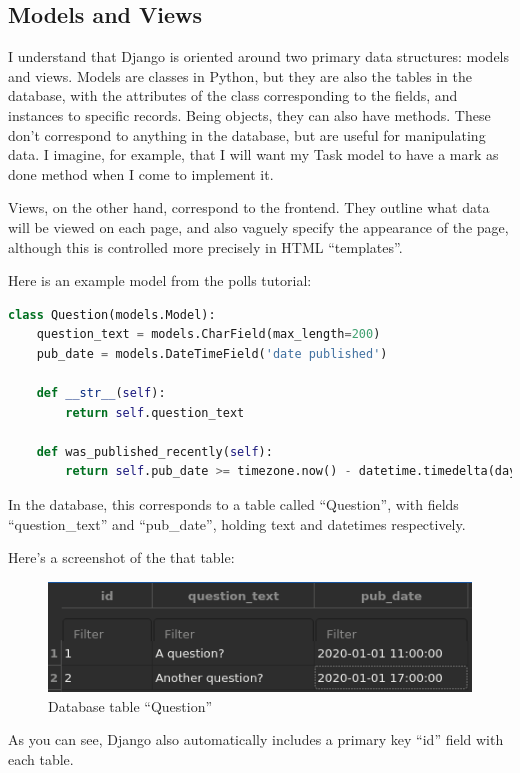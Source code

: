 \documentclass{article}
\begin{document}
\subsection{Models and Views}
I understand that Django is oriented around two primary data structures:
models and views.
Models are classes in Python,
but they are also the tables in the database,
with the attributes of the class corresponding to the fields,
and instances to specific records.
Being objects, they can also have methods.
These don't correspond to anything in the database,
but are useful for manipulating data.
I imagine, for example, that I will want my Task model to have a mark as done method when I come to implement it.

Views, on the other hand, correspond to the frontend.
They outline what data will be viewed on each page,
and also vaguely specify the appearance of the page,
although this is controlled more precisely in HTML ``templates''.

Here is an example model from the polls tutorial:
\begin{lstlisting}[language=Python]
class Question(models.Model):
    question_text = models.CharField(max_length=200)
    pub_date = models.DateTimeField('date published')

    def __str__(self):
        return self.question_text

    def was_published_recently(self):
        return self.pub_date >= timezone.now() - datetime.timedelta(days=1)
\end{lstlisting}

In the database,
this corresponds to a table called ``Question'',
with fields ``question\_text'' and ``pub\_date'',
holding text and datetimes respectively.

Here's a screenshot of the that table:

\begin{figure}[h!]
	\includegraphics[width=\linewidth]{Images/question_table.png}
	\caption{Database table ``Question''}
	\label{fig:database1}
\end{figure}

As you can see,
Django also automatically includes a primary key ``id'' field with each table.
\end{document}
